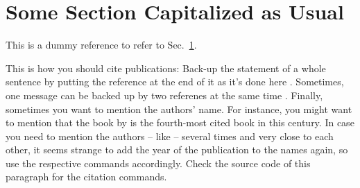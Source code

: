\section{Some Section Capitalized as Usual}\label{sec:FirstSection}

This is a dummy reference to refer to Sec.~\ref{sec:FirstSection}.

This is how you should cite publications: Back-up the statement of a whole sentence by putting the reference at the end of it as it's done here \citep{Helmert08HowGoodIsPerfect}. Sometimes, one message can be backed up by two referenes at the same time \citep{Erol96ComplexityResultsForHTN,RussellNorvig2016AIMA}. Finally, sometimes you want to mention the authors' name. For instance, you might want to mention that the book by \cite{RussellNorvig2016AIMA} is the fourth-most cited book in this century. In case you need to mention the authors -- like \citeauthor{RussellNorvig2016AIMA} -- several times and very close to each other, it seems strange to add the year of the publication to the names again, so use the respective commands accordingly. Check the source code of this paragraph for the citation commands.